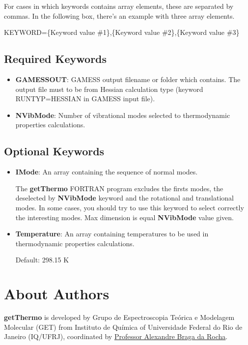 \documentclass[11pt,oneside,a4paper]{article}
\begin{document}
For cases in which keywords contains array elements, these are separated by commas. In the following box, there's an example with three array elements.
\begin{shaded}
KEYWORD=\{Keyword value \#1\},\{Keyword value \#2\},\{Keyword value \#3\}
\end{shaded}

\subsection{Required Keywords}
\begin{itemize}
\item \textbf{GAMESSOUT}: GAMESS output filename or folder which contains. The output file must to be from Hessian calculation type (keyword RUNTYP=HESSIAN in GAMESS input file).
\item \textbf{NVibMode}: Number of vibrational modes selected to thermodynamic properties calculations.
\end{itemize}

\subsection{Optional Keywords}
\begin{itemize}
\item \textbf{IMode}: An array containing the sequence of normal modes.

The \textbf{getThermo} FORTRAN program excludes	the firsts modes, the deselected by \textbf{NVibMode} keyword and the rotational and translational modes. In some cases, you should try to use this keyword to select correctly the interesting modes. Max dimension is equal \textbf{NVibMode} value given.

\item \textbf{Temperature}: An array containing temperatures to be used in thermodynamic properties calculations.

Default: 298.15 K
\end{itemize}

\pagebreak
\section[About Authors]{About Authors}

\textbf{getThermo} is developed by Grupo de Espectroscopia Teórica e Modelagem Molecular (GET) from Instituto de Química of Universidade Federal do Rio de Janeiro (IQ/UFRJ), coordinated by  \href{mailto:rocha@iq.ufrj.br}{Professor Alexandre Braga da Rocha}.
\end{document}
